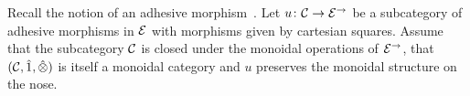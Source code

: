 \documentclass[reqno,10pt,a4paper,oneside]{amsart}
\begin{document}
\medskip


Recall the notion of an adhesive morphism~\cite{garner-lack:adhesive}.  Let $u \co \cal{C} \to \catE^{\to}$ be a subcategory of adhesive morphisms in $\catE$ with morphisms given by cartesian squares. Assume that the subcategory $\cal{C}$ is closed under the monoidal operations of $\catE^{\to}$, \ie that $(\cal{C}, \hatunit, \hatotimes)$ is itself a monoidal category and $u$ preserves the monoidal structure on the nose. 

\newpage











\end{document}
